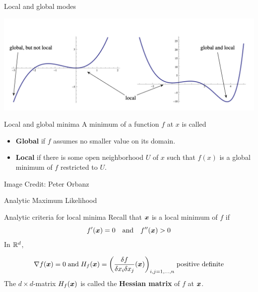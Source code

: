 \documentclass[10pt]{beamer}
\renewcommand{\bf}[1]{\textbf{{#1}}}
\newcommand{\bp}[1]{\bigg(  {#1} \bigg)}
\begin{document}
\begin{frame}{Local and global modes}

\begin{center}
\includegraphics[width=.8\textwidth]{images/types_of_minima}
\end{center}


\begin{sblock}{Local and global minima}
A minimum of a function $f$ at $x$ is called
\begin{itemize}
\item \bf{Global} if $f$ assumes no smaller value on its domain.
\item \bf{Local} if there is some open neighborhood $U$ of $x$ such that $f(x)$ is a global minimum of $f$ restricted to $U$.
\end{itemize}
\end{sblock}
\tiny \hfill Image Credit: Peter Orbanz
\end{frame}


\begin{frame}{Analytic Maximum Likelihood}



\begin{sblock}{Analytic criteria for local minima}
Recall that ${\boldsymbol x}$ is a local minimum of $f$ if
\[ f^\prime({\boldsymbol x}) = 0 \quad \text{and} \quad  f^{\prime \prime}({\boldsymbol x}) > 0  \]
In $\mathbb{R}^d$,

\[ \nabla f (\+x)  = 0 \; \text{and} \; H_f (\+x) = \bp{\df{\delta f}{\delta  x_i  \delta x_j}  (\+x) }_{ i,j= 1,...,n}   \; \text{positive definite} \]  
The $d \times  d$-matrix $H_f ({\boldsymbol x})$ is called the \bf{Hessian matrix} of $f$ at ${\boldsymbol x}$.
\end{sblock}

\end{frame}
\end{document}
